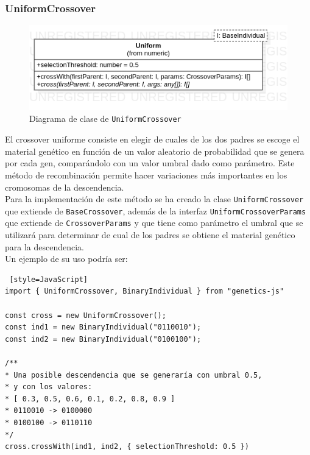 \subsubsection{UniformCrossover}

\begin{figure}[ht]
    \centering
    \includegraphics[scale=0.3]{mem/images/cap-4/4.2.6(Crossover)/Uniform.png}
    \caption{Diagrama de clase de \texttt{UniformCrossover}}
    \label{fig:my_label}
\end{figure}

El crossover uniforme \cite{syswerda1989uniform} consiste en elegir de cuales de los dos padres se escoge el material genético en función de un valor aleatorio de probabilidad que se genera por cada gen, comparándolo con un valor umbral dado como parámetro. Este método de recombinación permite hacer variaciones más importantes en los cromosomas de la descendencia. \\

Para la implementación de este método se ha creado la clase \texttt{UniformCrossover} que extiende de \texttt{BaseCrossover}, además de la interfaz \texttt{UniformCrossoverParams} que extiende de \texttt{CrossoverParams} y que tiene como parámetro el umbral que se utilizará para determinar de cual de los padres se obtiene el material genético para la descendencia. \\

Un ejemplo de su uso podría ser:

\begin{lstlisting} [style=JavaScript]
import { UniformCrossover, BinaryIndividual } from "genetics-js"

const cross = new UniformCrossover();
const ind1 = new BinaryIndividual("0110010");
const ind2 = new BinaryIndividual("0100100");

/**
* Una posible descendencia que se generaría con umbral 0.5,
* y con los valores:
* [ 0.3, 0.5, 0.6, 0.1, 0.2, 0.8, 0.9 ]
* 0110010 -> 0100000
* 0100100 -> 0110110
*/
cross.crossWith(ind1, ind2, { selectionThreshold: 0.5 })
\end{lstlisting}


